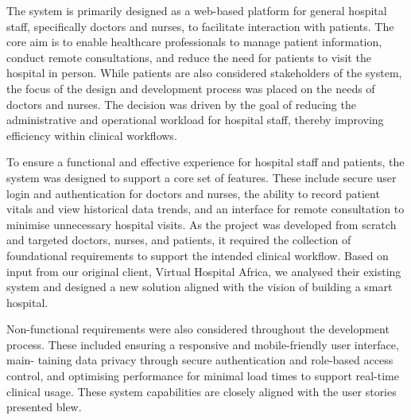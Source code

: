 The system is primarily designed as a web-based platform for general hospital staff, specifically doctors and nurses, to facilitate interaction with patients. The core aim is to enable healthcare professionals to manage patient information, conduct remote consultations, and reduce the need for patients to visit the hospital in person.
While patients are also considered stakeholders of the system, the focus of the design and development process was placed on the needs of doctors and nurses. The decision was driven by the goal of reducing the administrative and operational workload for hospital staff, thereby improving efficiency within clinical workflows.

To ensure a functional and effective experience for hospital staff and patients, the system was designed to support a core set of features. These include secure user login and authentication for doctors and nurses, the ability to record patient vitals and view historical data trends, and an interface for remote consultation to minimise unnecessary hospital visits.
As the project was developed from scratch and targeted doctors, nurses, and patients, it required the collection of foundational requirements to support the intended clinical workflow. Based on input from our original client, Virtual Hospital Africa, we analysed their existing system and designed a new solution aligned with the vision of building a smart hospital.

Non-functional requirements were also considered throughout the development process. These included ensuring a responsive and mobile-friendly user interface, main-
taining data privacy through secure authentication and role-based access control, and optimising
performance for minimal load times to support real-time clinical usage. These system capabilities are closely aligned with the user stories
presented blew.

